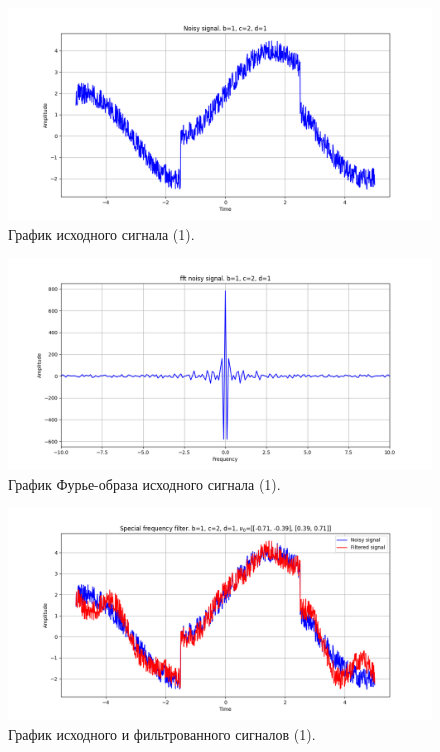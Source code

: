 \documentclass[a4paper, 12pt]{article}
\begin{document}
    \begin{figure}[H]
        \centering
        \includegraphics[scale=0.48]{1_u_nospec.png}
        \captionsetup{skip=0pt}
        \caption{График исходного сигнала (1).}
        \label{fig:fig69}
    \end{figure}
    \begin{figure}[!htb]
        \centering
        \includegraphics[scale=0.48]{1_fft_u_nospec.png}
        \captionsetup{skip=0pt}
        \caption{График Фурье-образа исходного сигнала (1).}
        \label{fig:fig70}
    \end{figure}
    \begin{figure}[!htb]
        \centering
        \includegraphics[scale=0.48]{1_u_flt_u_nospec.png}
        \captionsetup{skip=0pt}
        \caption{График исходного и фильтрованного сигналов (1).}
        \label{fig:fig71}
    \end{figure}
\end{document}

